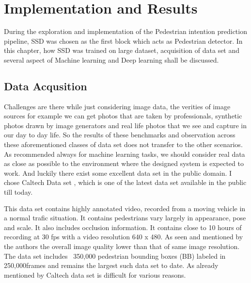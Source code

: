\chapter{Implementation and Results}
During the exploration and implementation of the Pedestrian intention prediction pipeline, SSD was chosen as the first block which acts as Pedestrian detector. In this chapter, how SSD was trained on large dataset, acquisition of data set and several aspect of Machine learning and Deep learning shall be discussed.

\section{Data Acqusition}
Challenges are there while just considering image data, the verities of image sources for example we can get photos that are taken by professionals, synthetic photos drawn by image generators and real life photos that we see and capture in our day to day life. So the results of these benchmarks and 
observation across these aforementioned classes of data set does not transfer to the other scenarios.
As recommended always for machine learning tasks, we should consider real data as close as possible to the environment where the designed system is expected to work. And luckily there exist some excellent data set in the public domain. I chose Caltech Data set \cite{dollar2009pedestrian}, which is one of the latest data set available in the public till today. 

\newpara
This data set contains highly annotated video, recorded from a moving vehicle in a normal trafic situation. It contains pedestrians vary largely in appearance, pose and scale. It also includes occlusion information. It contains close to 10 hours of recording at 30 fps with a video resolution 640 x 480. As seen and mentioned by the authors the overall image quality lower than that of same image resolution. The data set includes ~350,000  pedestrian bounding boxes (BB) labeled in 250,000frames and remains the largest such data set to  date. As already mentioned by \cite{walk2010new} Caltech data set is difficult for various reasons.

